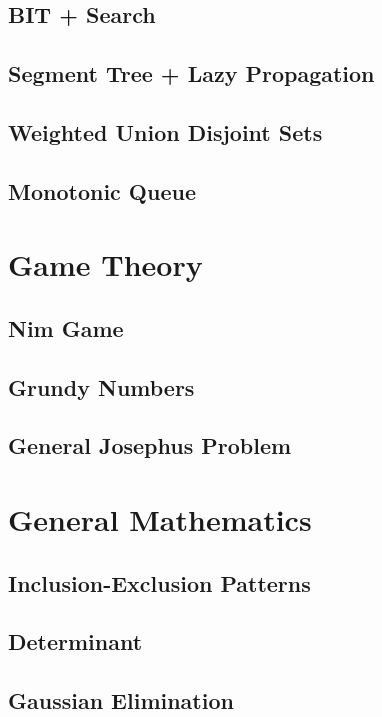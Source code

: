 		\subsection{BIT + Search}
			
		\subsection{Segment Tree + Lazy Propagation}
			
		\subsection{Weighted Union Disjoint Sets}
			
		\subsection{Monotonic Queue}
			
	\section{Game Theory}
		\subsection{Nim Game}
			
		\subsection{Grundy Numbers}
			
		\subsection{General Josephus Problem}
	\section{General Mathematics}
		\subsection{Inclusion-Exclusion Patterns}
			
		\subsection{Determinant}
			
		\subsection{Gaussian Elimination}
			
